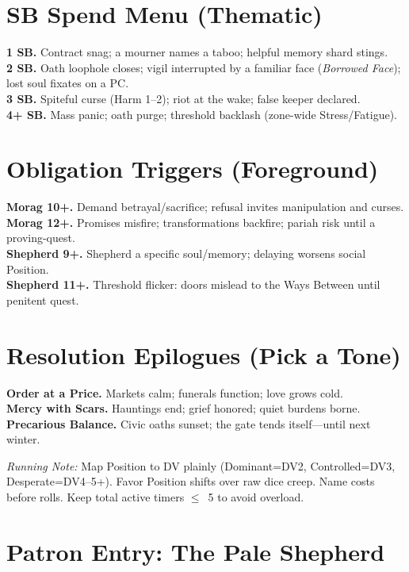 \documentclass[11pt]{article}
\begin{document}
\section*{SB Spend Menu (Thematic)}
\textbf{1 SB.} Contract snag; a mourner names a taboo; helpful memory shard stings.\\
\textbf{2 SB.} Oath loophole closes; vigil interrupted by a familiar face (\textit{Borrowed Face}); lost soul fixates on a PC.\\
\textbf{3 SB.} Spiteful curse (Harm 1--2); riot at the wake; false keeper declared.\\
\textbf{4+ SB.} Mass panic; oath purge; threshold backlash (zone-wide Stress/Fatigue).

\section*{Obligation Triggers (Foreground)}
\textbf{Morag 10+.} Demand betrayal/sacrifice; refusal invites manipulation and curses.\\
\textbf{Morag 12+.} Promises misfire; transformations backfire; pariah risk until a proving-quest.\\
\textbf{Shepherd 9+.} Shepherd a specific soul/memory; delaying worsens social Position.\\
\textbf{Shepherd 11+.} Threshold flicker: doors mislead to the Ways Between until penitent quest.

\section*{Resolution Epilogues (Pick a Tone)}
\textbf{Order at a Price.} Markets calm; funerals function; love grows cold.\\
\textbf{Mercy with Scars.} Hauntings end; grief honored; quiet burdens borne.\\
\textbf{Precarious Balance.} Civic oaths sunset; the gate tends itself---until next winter.

\vfill
\noindent\footnotesize\textit{Running Note:} Map Position to DV plainly (Dominant=DV2, Controlled=DV3, Desperate=DV4--5+). Favor Position shifts over raw dice creep. Name costs before rolls. Keep total active timers $\leq$~5 to avoid overload.

\appendix

\clearpage

\section{Patron Entry: The Pale Shepherd}
\label{patron:pale-shepherd}
\end{document}
